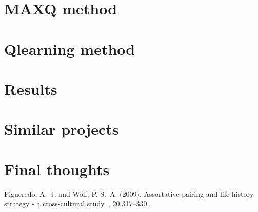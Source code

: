 \documentclass[twoside,twocolumn]{article}
\begin{document}
\section{MAXQ method}


\section{Qlearning method}
\section{Results}
\section{Similar projects}
\section{Final thoughts}


\begin{thebibliography}{99} %

Figueredo, A.~J. and Wolf, P. S.~A. (2009).
\newblock Assortative pairing and life history strategy - a cross-cultural
  study.
, 20:317--330.
 
\end{thebibliography}

\end{document}
